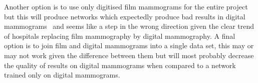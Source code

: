 Another option is to use only digitised film mammograms for the entire project but this will produce networks which expectedly produce bad results in digital mammograms~\cite{Zheng2012} and seems like a step in the wrong direction given the clear trend of hospitals replacing film mammography by digital mammography. A final option is to join film and digital mammograms into a single data set, this may or may not work given the difference between them but will most probably decrease the quality of results on digital mammograms when compared to a network trained only on digital mammograms.

\begin{comment}
Film Mammograms 
MIAS, DDSM, BancoWeb, CALMA, AMDI, B-screen, MiRAcle, BCDR-FM
inBeast paper has a good summary.

Digital 
INBreast, MIDAS (no labels), BCDR-DM

Clinical features: age, breast density, and family breast cancer history. 

Zheng2012 also says that "direct application of an SFM image-based CAD scheme to the FFDM images resulted in the substantial degradation of performance" "digitised image-based CAD can be converted for FFDMs while performing at a comparable, or better, level" "This is largely due to better contrast resolution, detection quantum efficiency and system linearity." He means converted as in retrained, though. (the ANN is completely retrained but it has little params)

Benchmarking datasets:
Moura, D.C., Loṕez, M.A.G., Cunha, P., De Posada, N.G., Pollan, R.R., Ramos, I., Loureiro, J.P., Moreira, I.C., De Araújo, B.M.F., Fernandes, T.C. Benchmarking datasets for breast cancer computer-aided diagnosis (CADx) (2013) Lecture Notes in Computer Science (including subseries Lecture Notes in Artificial Intelligence and Lecture Notes in Bioinformatics), 8258 LNCS (PART 1), pp. 326-333. 
show that 'this combination of clinical data and image descriptors is advantageous in most CADx scenarios.'
\end{comment}
